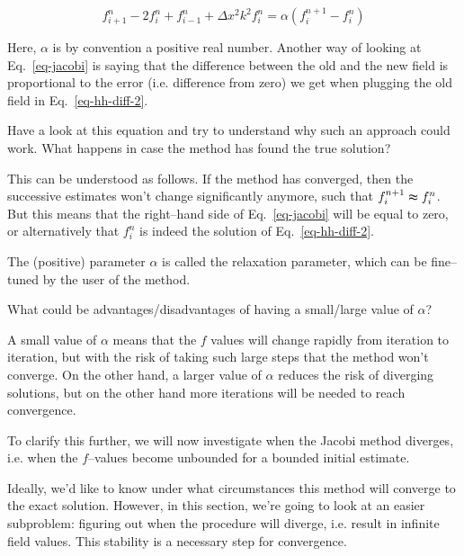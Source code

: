 \begin{equation}
f_{i+1}^n -2 f_i^n + f_{i-1}^n + \Delta x^2 k^2 f_i^n = \alpha (f_i^{n+1} - f_i^n ) \label{eq-jacobi}
\end{equation}  

Here, $\alpha$ is by convention a positive real number. Another way of looking at Eq.~\ref{eq-jacobi} is saying that the difference between the old and the new field is proportional to the error (i.e. difference from zero) we get when plugging the old field in Eq.~\ref{eq-hh-diff-2}.

\begin{cue}
Have a look at this equation and try to understand why such an approach could work. What happens in case the method has found the true solution?  
\end{cue}

This can be understood as follows. If the method has converged, then the successive estimates won't change significantly anymore, such that $ f_i^{n+1} \thickapprox f_i^n $. But this means that the right--hand side of Eq.~\ref{eq-jacobi} will be equal to zero, or alternatively that $f_i^n$ is indeed the solution of Eq.~\ref{eq-hh-diff-2}.

The (positive) parameter $\alpha$ is called the relaxation parameter, which can be fine--tuned by the user of the method.

\begin{cue}
What could be advantages/disadvantages of having a small/large value of $\alpha$? 
\end{cue}

A small value of $\alpha$ means that the $f$ values will change rapidly from iteration to iteration, but with the risk of taking such large steps that the method won't converge. On the other hand, a larger value of $\alpha$ reduces the risk of diverging solutions, but on the other hand more iterations will be needed to reach convergence.

To clarify this further, we will now investigate when the Jacobi method diverges, i.e. when the $f$--values become unbounded for a bounded initial estimate.


Ideally, we'd like to know under what circumstances this method will converge to the exact solution. However, in this section, we're going to look at an easier subproblem: figuring out when the procedure will diverge, i.e. result in infinite field values. This stability is a necessary step for convergence.

